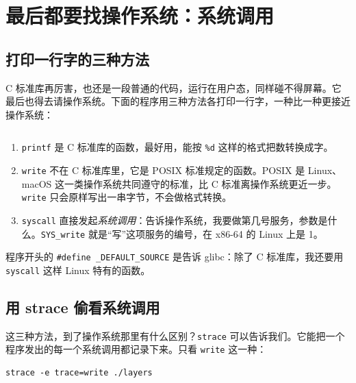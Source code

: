 \section{最后都要找操作系统：系统调用}
\label{sec:syscall}

\subsection{打印一行字的三种方法}

C 标准库再厉害，也还是一段普通的代码，运行在用户态，同样碰不得屏幕。它最后也得去请操作系统。下面的程序用三种方法各打印一行字，一种比一种更接近操作系统：


\inputminted[linenos=false]{text}{code/ch05/out/layers.txt}

\begin{enumerate}
  \item \texttt{printf} 是 C 标准库的函数，最好用，能按 \texttt{\%d} 这样的格式把数转换成字。
  \item \texttt{write} 不在 C 标准库里，它是 POSIX 标准规定的函数。POSIX 是 Linux、macOS 这一类操作系统共同遵守的标准，比 C 标准离操作系统更近一步。\texttt{write} 只会原样写出一串字节，不会做格式转换。
  \item \texttt{syscall} 直接发起\emph{系统调用}：告诉操作系统，我要做第几号服务，参数是什么。\texttt{SYS\_write} 就是“写”这项服务的编号，在 x86-64 的 Linux 上是 1。
\end{enumerate}

程序开头的 \texttt{\#define \_DEFAULT\_SOURCE} 是告诉 glibc：除了 C 标准库，我还要用 \texttt{syscall} 这样 Linux 特有的函数。

\subsection{用 strace 偷看系统调用}

这三种方法，到了操作系统那里有什么区别？\texttt{strace} 可以告诉我们。它能把一个程序发出的每一个系统调用都记录下来。只看 \texttt{write} 这一种：
\begin{verbatim}
strace -e trace=write ./layers
\end{verbatim}
\inputminted[linenos=false]{text}{code/ch05/out/strace_layers.txt}

